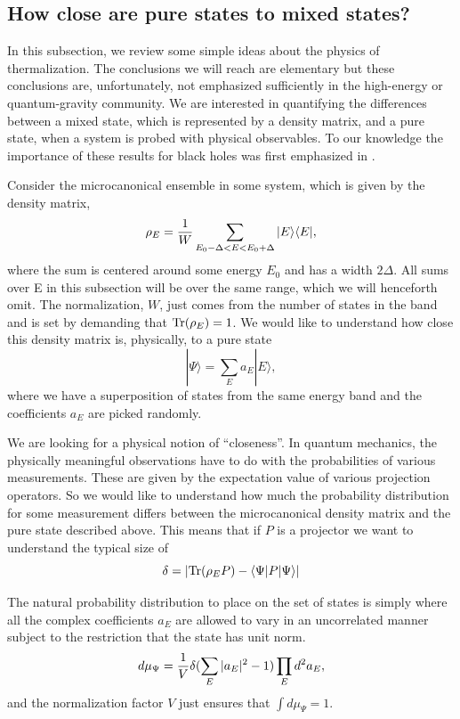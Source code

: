 \documentclass[12pt]{article}
\def\tr{{\rm Tr}}
\newcommand{\be}{\begin{equation}}
\newcommand{\ee}{\end{equation}}
\begin{document}
\subsection{How close are pure states to mixed states?\label{puremixed}}
In this subsection, we review some simple ideas about the physics of thermalization. The conclusions we will reach are elementary but these conclusions are, unfortunately,  not emphasized sufficiently in the high-energy or quantum-gravity
community.  We are interested in quantifying the differences between a mixed state, which is represented by a density matrix, and a pure state, when a system is probed with physical observables. To our knowledge the importance
of these results for black holes was first emphasized in  \cite{lloyd1988black}.

Consider the microcanonical ensemble in some system, which is given by the density
matrix,
\be
\label{microcan}
\rho_{E} = {1 \over W} \sum_{E_0 - \Delta < E < E_0 + \Delta}  |E \rangle \langle E|,
\ee
where the sum is centered around some energy $E_0$ and has a width $2 \Delta$. All sums over E in this subsection will be over the same range, which we will henceforth omit. The normalization, $W$, just comes from the number of states in the band and is set by demanding that $\tr(\rho_{E}) = 1$.  We would like to understand how close this density matrix is, physically, to a pure state
\be
\label{puremicro}
|\Psi \rangle = \sum_{E}  a_{E} | E \rangle,
\ee
where we have a superposition of  states from the same energy band and the coefficients $a_{E}$ are picked randomly.

We are looking for a physical notion of ``closeness''. In quantum mechanics, the physically meaningful observations have to do with the probabilities of various measurements. These are given by the expectation value of various projection operators. So we would like to understand how much the probability distribution for some measurement differs between the microcanonical density matrix and the pure state described above. This means that if $P$ is a projector we want to understand the typical size of
\[
\delta = \left| \tr(\rho_{E} P) - \langle \Psi | P | \Psi \rangle \right|
\]

The natural probability distribution to place on the set of states is simply where all the complex coefficients $a_{E}$ are allowed to vary in an uncorrelated manner subject to the restriction that the state has unit norm.
\be
\label{haarmeasure}
d \mu_{\Psi} = {1 \over V} \delta(\sum_{E} |a_{E}|^2 - 1)\prod_{E}  d^2 a_{E},
\ee
and the normalization factor $V$ just ensures that $\int d \mu_{\Psi} = 1$.
\end{document}

